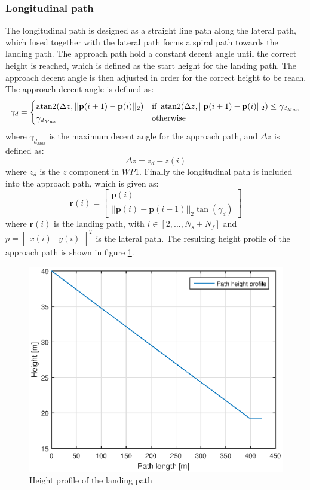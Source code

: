 \subsubsection{Longitudinal path}
The longitudinal path is designed as a straight line path along the lateral path, which fused together with the lateral path forms a spiral path towards the landing path. The approach path hold a constant decent angle until the correct height is reached, which is defined as the start height for the landing path. The approach decent angle is then adjusted in order for the correct height to be reach. The approach decent angle is defined as:
\begin{equation}
\gamma_d = \begin{cases}
\atan2(\Delta z,||\mathbf{p}(i+1)-\mathbf{p}(i)||_2) & \text{if } \atan2(\Delta z,||\mathbf{p}(i+1)-\mathbf{p}(i)||_2)\leq \gamma_{d_{Max}} \\
\gamma_{d_{Max}}										& \text{otherwise}
\end{cases}
\end{equation}
where $\gamma_{d_{Max}}$ is the maximum decent angle for the approach path, and $\Delta z$ is defined as:
\begin{equation}
\Delta z = z_d-z(i)
\end{equation}
where $z_d$ is the $z$ component in $WP1$. Finally the longitudinal path is included into the approach path, which is given as:
\begin{equation}
\mathbf{r}(i) = \begin{bmatrix}
\mathbf{p}(i) \\
||\mathbf{p}(i)-\mathbf{p}(i-1)||_2\tan(\gamma_d)
\end{bmatrix}
\end{equation}
where $\mathbf{r}(i)$ is the landing path, with $i \in [2,...,N_s+N_f]$ and 
$p = \begin{bmatrix}
x(i) & y(i)
\end{bmatrix}^T$ is the lateral path. The resulting height profile of the approach path is shown in figure \ref{Fig:HeightProfile}.
\begin{figure}[H]
	\centering
		\includegraphics[width=1\textwidth]{figs/SysPlot/heightProfile.eps}
		\caption{Height profile of the landing path}
		\label{Fig:HeightProfile}
\end{figure}
